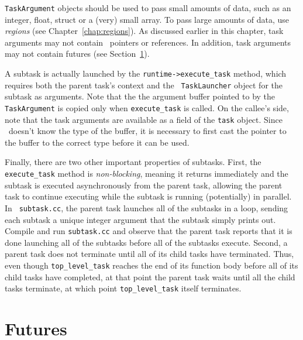 {\tt TaskArgument} objects should be used to pass small amounts of data,
such as an integer, float, struct or a (very) small array.  To pass large amounts of
data, use {\em regions} (see Chapter~\ref{chap:regions}).  As
discussed earlier in this chapter, task arguments may not contain
\Cpp\ pointers or references.  In addition, task arguments may not contain
futures (see Section~\ref{sec:futures}).

A subtask is actually launched by the {\tt runtime->execute\_task}
method, which requires both the parent task's context and the {\tt
  TaskLauncher} object for the subtask as arguments.  Note that the
the argument buffer pointed to by the {\tt TaskArgument} is copied
only when {\tt execute\_task} is called. On the callee's side, note
that the task arguments are available as a field of the {\tt task}
object. Since \Cpp\ doesn't know the type of the buffer, it is
necessary to first cast the pointer to the buffer to the correct type
before it can be used.

Finally, there are two other important properties of subtasks.  First,
the {\tt execute\_task} method is {\em non-blocking}, meaning it
returns immediately and the subtask is executed asynchronously from
the parent task, allowing the parent task to continue executing while
the subtask is running (potentially) in parallel.  In {\tt
  subtask.cc}, the parent task launches all of the subtasks in a loop,
sending each subtask a unique integer argument that the subtask simply prints
out.  Compile and run {\tt subtask.cc} and observe that the
parent task reports that it is done launching all of the subtasks
before all of the subtasks execute.  Second, a parent task does not
terminate until all of its child tasks have terminated.  Thus, even
though {\tt top\_level\_task} reaches the end of its function body
before all of its child tasks have completed, at that point the parent
task waits until all the child tasks terminate, at which point
{\tt top\_level\_task} itself terminates.

\section{Futures}
\label{sec:futures}

